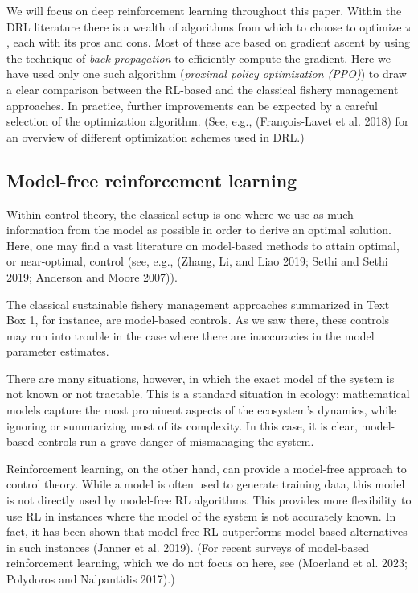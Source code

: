 \documentclass{article}
\begin{document}
We will focus on deep reinforcement learning throughout this paper.
Within the DRL literature there is a wealth of algorithms from which to
choose to optimize \(\pi\), each with its pros and cons. Most of these
are based on gradient ascent by using the technique of
\emph{back-propagation} to efficiently compute the gradient. Here we
have used only one such algorithm (\emph{proximal policy optimization
(PPO)}) to draw a clear comparison between the RL-based and the
classical fishery management approaches. In practice, further
improvements can be expected by a careful selection of the optimization
algorithm. (See, e.g., (François-Lavet et al. 2018) for an overview of
different optimization schemes used in DRL.)

\hypertarget{model-free-reinforcement-learning}{%
\subsection{Model-free reinforcement
learning}\label{model-free-reinforcement-learning}}

Within control theory, the classical setup is one where we use as much
information from the model as possible in order to derive an optimal
solution. Here, one may find a vast literature on model-based methods to
attain optimal, or near-optimal, control (see, e.g., (Zhang, Li, and
Liao 2019; Sethi and Sethi 2019; Anderson and Moore 2007)).

The classical sustainable fishery management approaches summarized in
Text Box 1, for instance, are model-based controls. As we saw there,
these controls may run into trouble in the case where there are
inaccuracies in the model parameter estimates.

There are many situations, however, in which the exact model of the
system is not known or not tractable. This is a standard situation in
ecology: mathematical models capture the most prominent aspects of the
ecosystem's dynamics, while ignoring or summarizing most of its
complexity. In this case, it is clear, model-based controls run a grave
danger of mismanaging the system.

Reinforcement learning, on the other hand, can provide a model-free
approach to control theory. While a model is often used to generate
training data, this model is not directly used by model-free RL
algorithms. This provides more flexibility to use RL in instances where
the model of the system is not accurately known. In fact, it has been
shown that model-free RL outperforms model-based alternatives in such
instances (Janner et al. 2019). (For recent surveys of model-based
reinforcement learning, which we do not focus on here, see (Moerland et
al. 2023; Polydoros and Nalpantidis 2017).)
\end{document}
